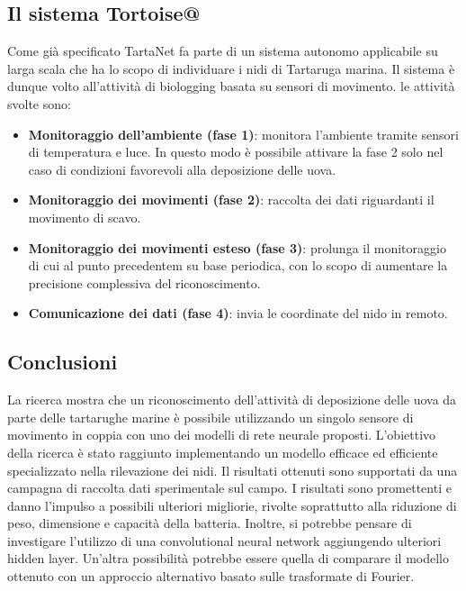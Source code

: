 \documentclass[12pt]{article}
\begin{document}
 		\subsection{Il sistema Tortoise@}
 			Come già specificato TartaNet fa parte di un sistema autonomo applicabile su larga scala che ha lo scopo di individuare i nidi di Tartaruga marina. Il sistema è dunque volto all'attività di biologging basata su sensori di movimento. le attività svolte sono:
 			\begin{itemize}
 				\item \textbf{Monitoraggio dell'ambiente (fase 1)}: monitora l'ambiente tramite sensori di temperatura e luce. In questo modo è possibile attivare la fase 2 solo nel caso di condizioni favorevoli alla deposizione delle uova.
 				\item \textbf{Monitoraggio dei movimenti (fase 2)}: raccolta dei dati riguardanti il movimento di scavo.
 				\item \textbf{Monitoraggio dei movimenti esteso (fase 3)}: prolunga il monitoraggio di cui al punto precedentem su base periodica, con lo scopo di aumentare la precisione complessiva del riconoscimento.
 				\item \textbf{Comunicazione dei dati (fase 4)}: invia le coordinate del nido in remoto.
 			\end{itemize}
 		\subsection{Conclusioni}
 			La ricerca mostra che un riconoscimento dell'attività di deposizione delle uova da parte delle tartarughe marine è possibile utilizzando un singolo sensore di movimento in coppia con uno dei modelli di rete neurale proposti. L'obiettivo della ricerca è stato raggiunto implementando un modello efficace ed efficiente specializzato nella rilevazione dei nidi. Il risultati ottenuti sono supportati da una campagna di raccolta dati sperimentale sul campo. I risultati sono promettenti e danno l'impulso a possibili ulteriori migliorie, rivolte soprattutto alla riduzione di peso, dimensione e capacità della batteria. Inoltre, si potrebbe pensare di investigare l'utilizzo di una convolutional neural network aggiungendo ulteriori hidden layer. Un'altra possibilità potrebbe essere quella di comparare il modello ottenuto con un approccio alternativo basato sulle trasformate di Fourier.
 			
\end{document}
